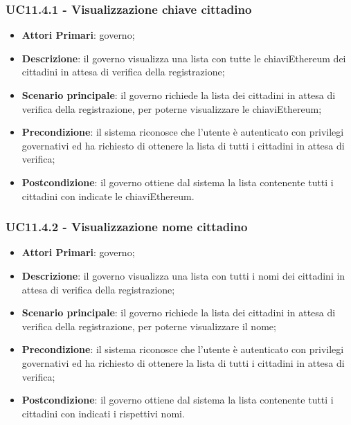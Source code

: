 \subsubsection{UC11.4.1 - Visualizzazione chiave cittadino}
\begin{itemize}
	\item \textbf{Attori Primari}: governo;
	\item \textbf{Descrizione}: il governo visualizza una lista con tutte le chiavi\glosp Ethereum dei cittadini in attesa di verifica della registrazione;
	\item \textbf{Scenario principale}: il governo richiede la lista dei cittadini in attesa di verifica della registrazione, per poterne visualizzare le chiavi\glosp Ethereum;
	\item \textbf{Precondizione}: il sistema riconosce che l'utente è autenticato con privilegi governativi ed ha richiesto di ottenere la lista di tutti i cittadini in attesa di verifica;
	\item \textbf{Postcondizione}: il governo ottiene dal sistema la lista contenente tutti i cittadini con indicate le chiavi\glosp Ethereum. 
\end{itemize}
\subsubsection{UC11.4.2 - Visualizzazione nome cittadino}
\begin{itemize}
	\item \textbf{Attori Primari}: governo;
	\item \textbf{Descrizione}: il governo visualizza una lista con tutti i nomi dei cittadini in attesa di verifica della registrazione;
	\item \textbf{Scenario principale}: il governo richiede la lista dei cittadini in attesa di verifica della registrazione, per poterne visualizzare il nome;
	\item \textbf{Precondizione}: il sistema riconosce che l'utente è autenticato con privilegi governativi ed ha richiesto di ottenere la lista di tutti i cittadini in attesa di verifica;
	\item \textbf{Postcondizione}: il governo ottiene dal sistema la lista contenente tutti i cittadini con indicati i rispettivi nomi.
\end{itemize}
